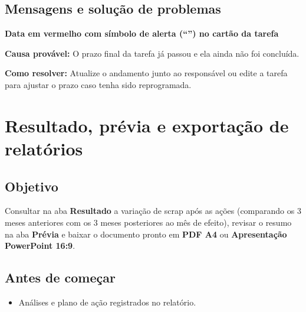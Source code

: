 \subsection*{Mensagens e solução de problemas}

\begin{remark}
\textbf{Data em vermelho com símbolo de alerta (``\faExclamationTriangle{}'') no cartão da tarefa}\par
\textbf{Causa provável:} O prazo final da tarefa já passou e ela ainda não foi concluída.\par
\textbf{Como resolver:} Atualize o andamento junto ao responsável ou edite a tarefa para ajustar o prazo caso tenha sido reprogramada.
\end{remark}

\section{Resultado, prévia e exportação de relatórios}

\subsection*{Objetivo}

Consultar na aba \textbf{Resultado} a variação de scrap após as ações (comparando os 3 meses anteriores com os 3 meses posteriores ao mês de efeito), revisar o resumo na aba \textbf{Prévia} e baixar o documento pronto em \textbf{PDF A4} ou \textbf{Apresentação PowerPoint 16:9}.\par

\subsection*{Antes de começar}

\begin{itemize}
\item Análises e plano de ação registrados no relatório.
\end{itemize}

